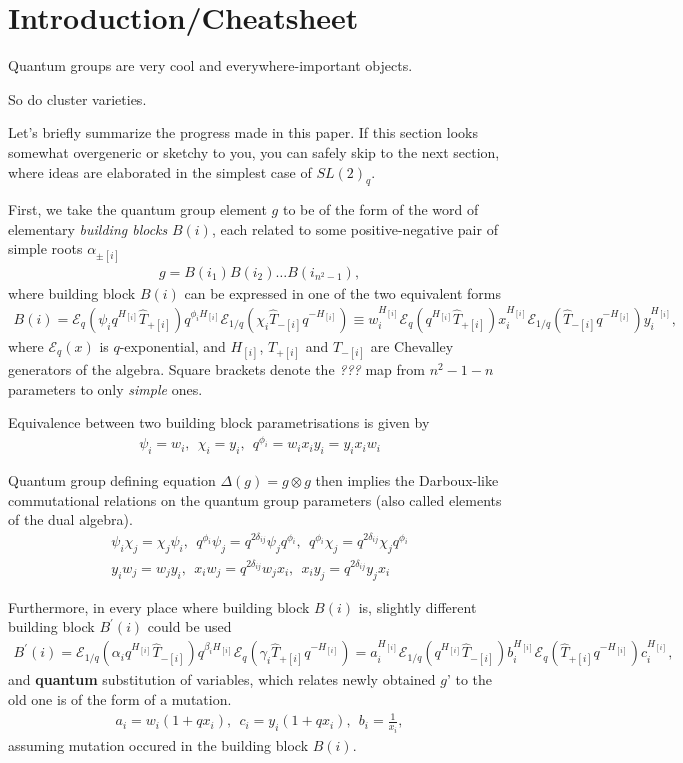 \documentclass{article}
\newcommand{\lb}{\left (}
\newcommand{\rb}{\right )}
\newcommand{\lsb}{\left [}
\newcommand{\rsb}{\right ]}
\newcommand{\be}{\begin{eqnarray}}
\newcommand{\ee}{\end{eqnarray}}
\newcommand {\?}{\textit{???}}
\newcommand{\me}[0]{\mathcal{E}}
\newcommand{\hT}[0]{\hat{T}}
\def\dg{\Delta (g)}
\def\gog{g \otimes g}
\begin{document}
\section{Introduction/Cheatsheet}
Quantum groups are very cool and everywhere-important objects.

So do cluster varieties.

Let's briefly summarize the progress made in this paper.
If this section looks somewhat overgeneric or sketchy to you, you can safely skip to the next
section, where ideas are elaborated in the simplest case of $SL(2)_q$.

First, we take the quantum group element $g$ to be of the form
of the word of elementary {\it building blocks} $B(i)$, each related to some positive-negative pair
of simple roots $\alpha_{\pm \lsb i \rsb}$
\be
g = B \lb i_1 \rb B \lb i_2 \rb \dots B \lb i_{n^2-1} \rb,
\ee
where building block $B(i)$ can be expressed in one of the two equivalent forms
\be
B(i) = \me_q \lb \psi_i q^{H_{[i]}} \hT_{+[i]} \rb q^{\phi_i H_{[i]}} \me_{1/q} \lb \chi_i \hT_{-[i]} q^{-H_{[i]}} \rb
\equiv
w_i^{H_{[i]}} \me_q \lb q^{H_{[i]}} \hT_{+[i]} \rb x_i^{H_{[i]}} \me_{1/q} \lb \hT_{-[i]} q^{-H_{[i]}} \rb y_i^{H_{[i]}},
\ee
where $\me_q(x)$ is $q$-exponential, and $H_{[i]}$, $T_{+[i]}$ and $T_{-[i]}$ are Chevalley generators of the algebra.
Square brackets denote the \? map from $n^2-1-n$ parameters to only {\it simple} ones.

Equivalence between two building block parametrisations is given by
\be
\psi_i = w_i,\ \ \chi_i = y_i,\ \ q^{\phi_i} = w_i x_i y_i = y_i x_i w_i
\ee

Quantum group defining equation $\dg = \gog$ then implies the Darboux-like commutational
relations on the quantum group parameters (also called elements of the dual algebra).
\be
& \psi_i \chi_j = \chi_j \psi_i, \ \ q^{\phi_i} \psi_j = q^{2 \delta_{ij}} \psi_j q^{\phi_i}, \ \
q^{\phi_i} \chi_j = q^{2 \delta_{ij}} \chi_j q^{\phi_i} & \\ &
y_i w_j = w_j y_i, \ \ x_i w_j = q^{2\delta_{ij}} w_j x_i, \ \ x_i y_j = q^{2\delta_{ij}} y_j x_i
\ee

Furthermore, in every place where building block $B(i)$ is, slightly
different building block $B^{'}(i)$ could be used
\be
B^{'}(i) = \me_{1/q} \lb \alpha_i q^{H_{[i]}} \hT_{-[i]} \rb q^{\beta_i H_{[i]}} \me_q \lb \gamma_i \hT_{+[i]} q^{-H_{[i]}} \rb   = 
a_i^{H_{[i]}} \me_{1/q} \lb q^{H_{[i]}} \hT_{-[i]} \rb b_i^{H_{[i]}} \me_q \lb  \hT_{+[i]} q^{-H_{[i]}} \rb c_i^{H_{[i]}},
\ee
and {\bf quantum} substitution of variables, which relates newly obtained $g$' to the old one
is of the form of a mutation.
\be
a_i = w_i(1 + q x_i), \ \ c_i = y_i(1 + q x_i), \ \ b_i = \frac{1}{x_i},
\ee 
assuming mutation occured in the building block $B(i)$.
\end{document}
